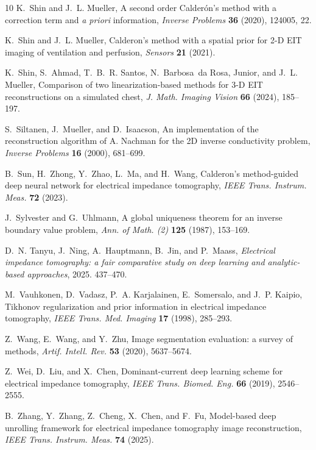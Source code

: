 \documentclass[11pt]{article}
\begin{document}
\begin{thebibliography}{10}
	K.~Shin and J.~L. Mueller, A second order {C}alder\'on's method with a
	correction term and {\it a priori} information, \textit{Inverse Problems}
	\textbf{36} (2020), 124005, 22.
	
	K.~Shin and J.~L. Mueller, Calderon's method with a spatial prior for 2-{D}
	{EIT} imaging of ventilation and perfusion, \textit{Sensors} \textbf{21}
	(2021).
	
	K.~Shin, S.~Ahmad, T.~B.~R. Santos, N.~Barbosa~da Rosa, Junior, and J.~L.
	Mueller, Comparison of two linearization-based methods for 3-{D} {EIT}
	reconstructions on a simulated chest, \textit{J. Math. Imaging Vision}
	\textbf{66} (2024), 185--197.
	
	S.~Siltanen, J.~Mueller, and D.~Isaacson, An implementation of the
	reconstruction algorithm of {A}. {N}achman for the 2{D} inverse conductivity
	problem, \textit{Inverse Problems} \textbf{16} (2000), 681--699.
	
	B.~Sun, H.~Zhong, Y.~Zhao, L.~Ma, and H.~Wang, Calderon's method-guided deep
	neural network for electrical impedance tomography, \textit{IEEE Trans.
		Instrum. Meas.} \textbf{72} (2023).
	
	J.~Sylvester and G.~Uhlmann, A global uniqueness theorem for an inverse
	boundary value problem, \textit{Ann. of Math. (2)} \textbf{125} (1987),
	153--169.
	
	D.~N. Tanyu, J.~Ning, A.~Hauptmann, B.~Jin, and P.~Maass, \textit{Electrical
		impedance tomography: a fair comparative study on deep learning and
		analytic-based approaches}, 2025. 437--470.
	
	M.~Vauhkonen, D.~Vadasz, P.~A. Karjalainen, E.~Somersalo, and J.~P. Kaipio,
	Tikhonov regularization and prior information in electrical impedance
	tomography, \textit{IEEE Trans. Med. Imaging} \textbf{17} (1998), 285--293.
	
	Z.~Wang, E.~Wang, and Y.~Zhu, Image segmentation evaluation: a survey of
	methods, \textit{Artif. Intell. Rev.} \textbf{53} (2020), 5637--5674.
	
	Z.~Wei, D.~Liu, and X.~Chen, Dominant-current deep learning scheme for
	electrical impedance tomography, \textit{IEEE Trans. Biomed. Eng.}
	\textbf{66} (2019), 2546--2555.
	
	B.~Zhang, Y.~Zhang, Z.~Cheng, X.~Chen, and F.~Fu, Model-based deep unrolling
	framework for electrical impedance tomography image reconstruction,
	\textit{IEEE Trans. Instrum. Meas.} \textbf{74} (2025).
\end{thebibliography}
\end{document}
